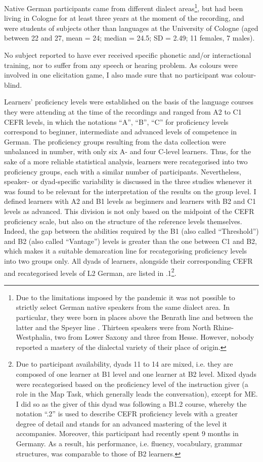 Native German participants came from different dialect areas\footnote{Due to the limitations imposed by the pandemic it was not possible to strictly select German native speakers from the same dialect area. In particular, they were born in places above the Benrath line \citep{Wenker1877} and between the latter and the Speyer line \citep{Paul2013}. Thirteen speakers were from North Rhine-Westphalia, two from Lower Saxony and three from Hesse. However, nobody reported a mastery of the dialectal variety of their place of origin.}, but had been living in Cologne for at least three years at the moment of the recording, and were students of subjects other than languages at the University of Cologne (aged between 22 and 27, mean = 24; median = 24.5; SD = 2.49; 11 females, 7 males).

No subject reported to have ever received specific phonetic and/or interactional training, nor to suffer from any speech or hearing problem. As colours were involved in one elicitation game, I also made sure that no participant was colour-blind.

Learners’ proficiency levels were established on the basis of the language courses they were attending at the time of the recordings and ranged from A2 to C1 CEFR levels, in which the notations “A”, “B”, “C” for proficiency levels correspond to beginner, intermediate and advanced levels of competence in German. The proficiency groups resulting from the data collection were unbalanced in number, with only six A- and four C-level learners. Thus, for the sake of a more reliable statistical analysis, learners were recategorised into two proficiency groups, each with a similar number of participants. Nevertheless, speaker- or dyad-specific variability is discussed in the three studies whenever it was found to be relevant for the interpretation of the results on the group level. I defined learners with A2 and B1 levels as beginners and learners with B2 and C1 levels as advanced. This division is not only based on the midpoint of the CEFR proficiency scale, but also on the structure of the reference levels themselves. Indeed, the gap between the abilities required by the B1 (also called “Threshold”) and B2 (also called “Vantage”) levels is greater than the one between C1 and B2, which makes it a suitable demarcation line for recategorising proficiency levels into two groups only. All dyads of learners, alongside their corresponding CEFR and recategorised levels of L2 German, are listed in .1\footnote{Due to participant availability, dyads 11 to 14 are mixed, i.e. they are composed of one learner at B1 level and one learner at B2 level. Mixed dyads were recategorised based on the proficiency level of the instruction giver (a role in the Map Task, which generally leads the conversation), except for ME. I did so as the giver of this dyad was following a B1.2 course, whereby the notation “.2” is used to describe CEFR proficiency levels with a greater degree of detail and stands for an advanced mastering of the level it accompanies. Moreover, this participant had recently spent 9 months in Germany. As a result, his performance, i.e. fluency, vocabulary, grammar structures, was comparable to those of B2 learners.}.

